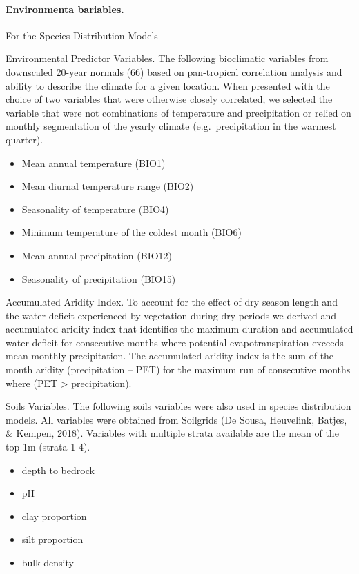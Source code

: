 \documentclass[]{article}
\providecommand{\tightlist}{%
  \setlength{\itemsep}{0pt}\setlength{\parskip}{0pt}}
\let\oldparagraph\paragraph
\renewcommand{\paragraph}[1]{\oldparagraph{#1}\mbox{}}
\begin{document}
\hypertarget{environmenta-bariables.}{%
\paragraph{Environmenta bariables.}\label{environmenta-bariables.}}

For the Species Distribution Models

Environmental Predictor Variables. The following bioclimatic variables from downscaled 20-year normals (66) based on pan-tropical correlation analysis and ability to describe the climate for a given location. When presented with the choice of two variables that were otherwise closely correlated, we selected the variable that were not combinations of temperature and precipitation or relied on monthly segmentation of the yearly climate (e.g.~precipitation in the warmest quarter).

\begin{itemize}
\tightlist
\item
  Mean annual temperature (BIO1)
\item
  Mean diurnal temperature range (BIO2)
\item
  Seasonality of temperature (BIO4)
\item
  Minimum temperature of the coldest month (BIO6)
\item
  Mean annual precipitation (BIO12)
\item
  Seasonality of precipitation (BIO15)
\end{itemize}

Accumulated Aridity Index. To account for the effect of dry season length and the water deficit experienced by vegetation during dry periods we derived and accumulated aridity index that identifies the maximum duration and accumulated water deficit for consecutive months where potential evapotranspiration exceeds mean monthly precipitation. The accumulated aridity index is the sum of the month aridity (precipitation -- PET) for the maximum run of consecutive months where (PET \textgreater{} precipitation).

Soils Variables. The following soils variables were also used in species distribution models. All variables were obtained from Soilgrids (De Sousa, Heuvelink, Batjes, \& Kempen, 2018). Variables with multiple strata available are the mean of the top 1m (strata 1-4).

\begin{itemize}
\tightlist
\item
  depth to bedrock
\item
  pH
\item
  clay proportion\\
\item
  silt proportion
\item
  bulk density
\end{itemize}
\end{document}
